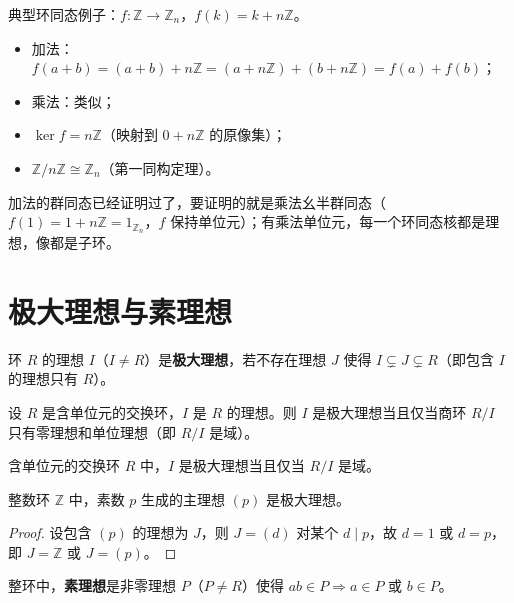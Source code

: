 \begin{example}
典型环同态例子：$f \colon \mathbb{Z} \to \mathbb{Z}_n$，$f(k) = k + n\mathbb{Z}$。
\begin{itemize}
  \item 加法：$f(a+b) = (a+b) + n\mathbb{Z} = (a + n\mathbb{Z}) + (b + n\mathbb{Z}) = f(a) + f(b)$；
  \item 乘法：类似；
  \item $\ker f = n\mathbb{Z}$（映射到 $0 + n\mathbb{Z}$ 的原像集）；
  \item $\mathbb{Z} / n\mathbb{Z} \cong \mathbb{Z}_n$（第一同构定理）。
\end{itemize}
加法的群同态已经证明过了，要证明的就是乘法幺半群同态（$f(1) = 1 + n\mathbb{Z} = 1_{\mathbb{Z}_n}$，$f$ 保持单位元）；有乘法单位元，每一个环同态核都是理想，像都是子环。
\end{example}

\section{极大理想与素理想}

\begin{definition}[极大理想]
环 $R$ 的理想 $I$（$I \ne R$）是\textbf{极大理想}，若不存在理想 $J$ 使得 $I \subsetneq J \subsetneq R$（即包含 $I$ 的理想只有 $R$）。
\end{definition}

\begin{lemma}[极大理想与商环（引理 1）]
设 $R$ 是含单位元的交换环，$I$ 是 $R$ 的理想。则 $I$ 是极大理想当且仅当商环 $R/I$ 只有零理想和单位理想（即 $R/I$ 是域）。
\end{lemma}

\begin{theorem}[极大理想与域]
含单位元的交换环 $R$ 中，$I$ 是极大理想当且仅当 $R/I$ 是域。
\end{theorem}

\begin{proposition}[整数环中的极大理想]
整数环 $\mathbb{Z}$ 中，素数 $p$ 生成的主理想 $(p)$ 是极大理想。
\end{proposition}

\begin{proof}
设包含 $(p)$ 的理想为 $J$，则 $J = (d)$ 对某个 $d \mid p$，故 $d = 1$ 或 $d = p$，即 $J = \mathbb{Z}$ 或 $J = (p)$。
\end{proof}

\begin{lemma}[引理 2.7, 2.8：素理想与素数]
整环中，\textbf{素理想}是非零理想 $P$（$P \ne R$）使得 $ab \in P \Rightarrow a \in P$ 或 $b \in P$。
\end{lemma}

